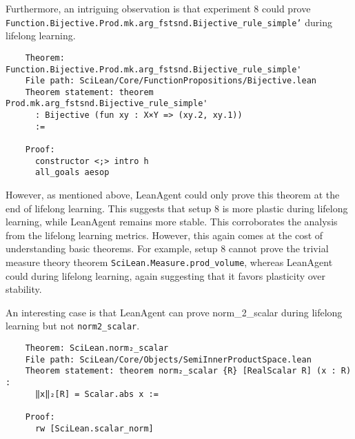 \documentclass{article} %
\begin{document}
Furthermore, an intriguing observation is that experiment 8 could prove \texttt{Function.Bijective.Prod.mk.arg\_fstsnd.Bijective\_rule\_simple'} during lifelong learning. 

\begin{verbatim}
    Theorem: Function.Bijective.Prod.mk.arg_fstsnd.Bijective_rule_simple'
    File path: SciLean/Core/FunctionPropositions/Bijective.lean
    Theorem statement: theorem Prod.mk.arg_fstsnd.Bijective_rule_simple'
      : Bijective (fun xy : X×Y => (xy.2, xy.1))
      :=
    
    Proof:
      constructor <;> intro h
      all_goals aesop
\end{verbatim}


However, as mentioned above, LeanAgent could only prove this theorem at the end of lifelong learning. This suggests that setup 8 is more plastic during lifelong learning, while LeanAgent remains more stable. This corroborates the analysis from the lifelong learning metrics. However, this again comes at the cost of understanding basic theorems. For example, setup 8 cannot prove the trivial measure theory theorem \texttt{SciLean.Measure.prod\_volume}, whereas LeanAgent could during lifelong learning, again suggesting that it favors plasticity over stability.

An interesting case is that LeanAgent can prove norm_{2}\_scalar during lifelong learning but not \texttt{norm2\_scalar}.

\begin{verbatim}
    Theorem: SciLean.norm₂_scalar
    File path: SciLean/Core/Objects/SemiInnerProductSpace.lean
    Theorem statement: theorem norm₂_scalar {R} [RealScalar R] (x : R) :
      ‖x‖₂[R] = Scalar.abs x :=
    
    Proof:
      rw [SciLean.scalar_norm]
\end{verbatim}
\end{document}
